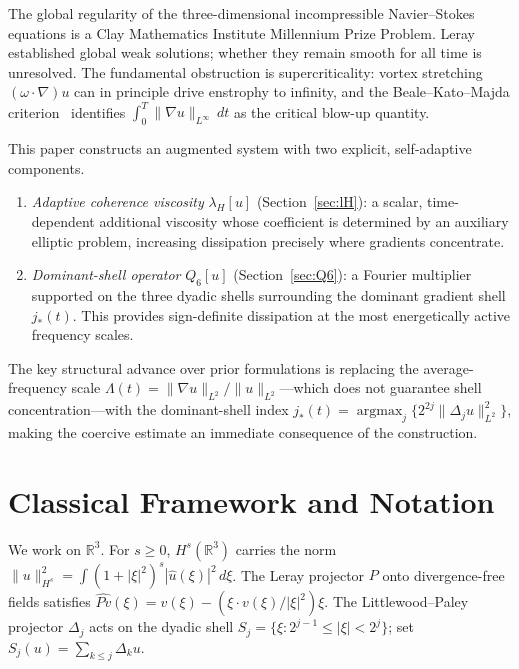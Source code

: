 \documentclass[12pt]{amsart}
\theoremstyle{remark}
\newcommand{\R}{\mathbb{R}}
\newcommand{\lH}{\lambda_H}
\newcommand{\Qsix}{Q_6}
\newcommand{\jstar}{j_*(t)}
\begin{document}
The global regularity of the three-dimensional incompressible
Navier--Stokes equations is a Clay Mathematics Institute Millennium
Prize Problem. Leray~\cite{Ler34} established global weak solutions;
whether they remain smooth for all time is unresolved.  The fundamental
obstruction is supercriticality: vortex stretching $(\omega\cdot\nabla)u$
can in principle drive enstrophy to infinity, and the
Beale--Kato--Majda criterion~\cite{BKM84} identifies
$\int_0^T\|\nabla u\|_{L^\infty}\,dt$ as the critical blow-up quantity.

This paper constructs an augmented system with two explicit,
self-adaptive components.
\begin{enumerate}
\item \emph{Adaptive coherence viscosity} $\lH[u]$
  (Section~\ref{sec:lH}): a scalar, time-dependent additional viscosity
  whose coefficient is determined by an auxiliary elliptic problem,
  increasing dissipation precisely where gradients concentrate.
\item \emph{Dominant-shell operator} $\Qsix[u]$
  (Section~\ref{sec:Q6}): a Fourier multiplier supported on the three
  dyadic shells surrounding the dominant gradient shell $\jstar$.
  This provides sign-definite dissipation at the most energetically
  active frequency scales.
\end{enumerate}

The key structural advance over prior formulations is replacing the
average-frequency scale
$\Lambda(t)=\|\nabla u\|_{L^2}/\|u\|_{L^2}$---which does not guarantee
shell concentration---with the dominant-shell index
$j_*(t)=\operatorname{argmax}_j\{2^{2j}\|\Delta_j u\|_{L^2}^2\}$,
making the coercive estimate an immediate consequence of the
construction.

\section{Classical Framework and Notation}
\label{sec:classical}

We work on $\R^3$.  For $s\ge 0$, $H^s(\R^3)$ carries the norm
$\|u\|_{H^s}^2=\int(1+|\xi|^2)^s|\hat u(\xi)|^2\,d\xi$.
The Leray projector $P$ onto divergence-free fields satisfies
$\widehat{Pv}(\xi)=v(\xi)-(\xi\cdot v(\xi)/|\xi|^2)\xi$.
The Littlewood--Paley projector $\Delta_j$ acts on the dyadic shell
$S_j=\{\xi:2^{j-1}\le|\xi|<2^j\}$; set $S_j(u)=\sum_{k\le j}\Delta_ku$.
\end{document}
